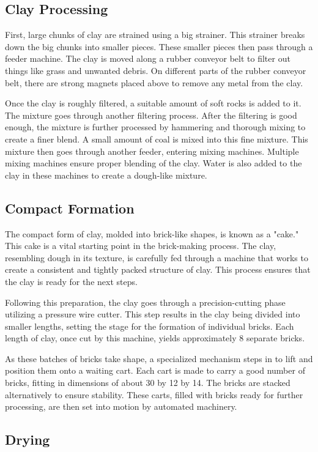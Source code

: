 \subsection*{Clay Processing}
First, large chunks of clay are strained using a big strainer. This strainer breaks down the big chunks into smaller pieces. These smaller pieces then pass through a feeder machine. The clay is moved along a rubber conveyor belt to filter out things like grass and unwanted debris. On different parts of the rubber conveyor belt, there are strong magnets placed above to remove any metal from the clay.

Once the clay is roughly filtered, a suitable amount of soft rocks is added to it. The mixture goes through another filtering process. After the filtering is good enough, the mixture is further processed by hammering and thorough mixing to create a finer blend. A small amount of coal is mixed into this fine mixture. This mixture then goes through another feeder, entering mixing machines. Multiple mixing machines ensure proper blending of the clay. Water is also added to the clay in these machines to create a dough-like mixture.

\subsection*{Compact Formation}
The compact form of clay, molded into brick-like shapes, is known as a "cake." This cake is a vital starting point in the brick-making process. The clay, resembling dough in its texture, is carefully fed through a machine that works to create a consistent and tightly packed structure of clay. This process ensures that the clay is ready for the next steps.

Following this preparation, the clay goes through a precision-cutting phase utilizing a pressure wire cutter. This step results in the clay being divided into smaller lengths, setting the stage for the formation of individual bricks. Each length of clay, once cut by this machine, yields approximately 8 separate bricks.

As these batches of bricks take shape, a specialized mechanism steps in to lift and position them onto a waiting cart. Each cart is made to carry a good number of bricks, fitting in dimensions of about 30 by 12 by 14. The bricks are stacked alternatively to ensure stability. These carts, filled with bricks ready for further processing, are then set into motion by automated machinery.

\subsection*{Drying}